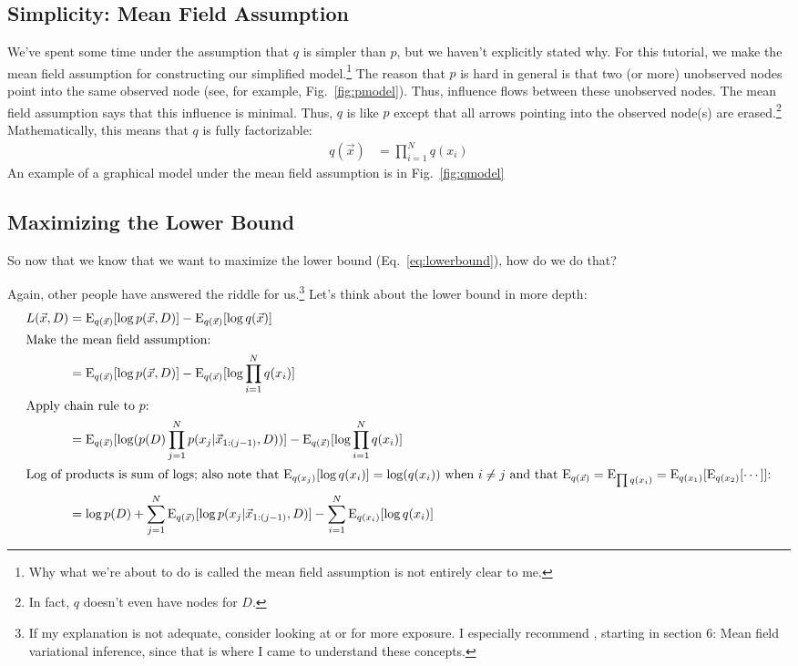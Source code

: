 \documentclass[12pt]{article}
\newcommand{\E}{\operatorname{E}}
\begin{document}
\subsection{Simplicity:  Mean Field Assumption}

We've spent some time under the assumption that $q$ is simpler than $p$, but we
haven't explicitly stated why.  For this tutorial, we make the mean field
assumption for constructing our simplified model.\footnote{Why what we're about
to do is called the mean field assumption is not entirely clear to me.}  The
reason that $p$ is hard in general is that two (or more) unobserved nodes point
into the same observed node (see, for example, Fig.~\ref{fig:pmodel}).  Thus,
influence flows between these unobserved nodes.  The mean field assumption says
that this influence is minimal.  Thus, $q$ is like $p$ except that all arrows
pointing into the observed node(s) are erased.\footnote{In fact, $q$ doesn't
even have nodes for $D$.}  Mathematically, this means that $q$ is fully
factorizable:
\begin{align}\label{eq:q}
    q(\vec{x}) &= \prod_{i=1}^{N} q(x_{i})
\end{align}
An example of a graphical model under the mean field assumption is in
Fig.~\ref{fig:qmodel}

\subsection{Maximizing the Lower Bound}

So now that we know that we want to maximize the lower bound
(Eq.~\ref{eq:lowerbound}), how do we do that?

Again, other people have answered the riddle for us.\footnote{If my explanation
is not adequate, consider looking at \autocite{wikivar} or
\autocite{bleinotesvar} for more exposure.  I especially recommend
\autocite{bleinotesvar}, starting in section 6:  Mean field variational
inference, since that is where I came to understand these concepts.}  Let's
think about the lower bound in more depth:
\begin{align}
    L(\vec{x},D) &= \E_{q(\vec{x})}[\log p(\vec{x},D)]
    - \E_{q(\vec{x})}[\log q(\vec{x})]
    \nonumber \\
    \intertext{Make the mean field assumption:}
    &= \E_{q(\vec{x})}[\log p(\vec{x},D)]
    - \E_{q(\vec{x})}[\log \prod_{i=1}^{N} q(x_{i})]
    \nonumber \\
    \intertext{Apply chain rule to $p$:}
    &= \E_{q(\vec{x})}[\log (p(D)\prod_{j=1}^{N}p(x_{j}|\vec{x}_{1:(j-1)}, D))]
    - \E_{q(\vec{x})}[\log \prod_{i=1}^{N} q(x_{i})]
    \nonumber \\
    \intertext{Log of products is sum of logs; also note that
    $\E_{q(x_{j})}[\log q(x_{i})] = \log(q(x_{i}))$ when $i \neq j$ and that
    $\E_{q(\vec{x})} = \E_{\prod q(x_{i})} = \E_{q(x_1)}[\E_{q(x_2)}[\cdots]]$:}
    &= \log p(D) + \sum_{j=1}^{N} \E_{q(\vec{x})}[\log p(x_{j}|\vec{x}_{1:(j-1)},D)]
    - \sum_{i=1}^{N} \E_{q(x_{i})}[\log q(x_{i})]
\end{align}
\end{document}
